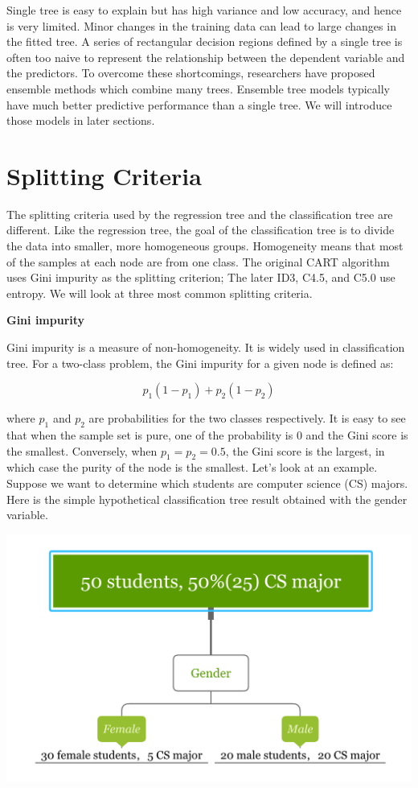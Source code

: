 \documentclass[12pt,]{krantz}
\begin{document}
Single tree is easy to explain but has high variance and low accuracy, and hence is very limited. Minor changes in the training data can lead to large changes in the fitted tree. A series of rectangular decision regions defined by a single tree is often too naive to represent the relationship between the dependent variable and the predictors. To overcome these shortcomings, researchers have proposed ensemble methods which combine many trees. Ensemble tree models typically have much better predictive performance than a single tree. We will introduce those models in later sections.

\hypertarget{splitting-criteria}{%
\section{Splitting Criteria}\label{splitting-criteria}}

The splitting criteria used by the regression tree and the classification tree are different. Like the regression tree, the goal of the classification tree is to divide the data into smaller, more homogeneous groups. Homogeneity means that most of the samples at each node are from one class. The original CART algorithm uses Gini impurity as the splitting criterion; The later ID3, C4.5, and C5.0 use entropy. We will look at three most common splitting criteria.

\textbf{Gini impurity}

Gini impurity\citep{Breiman1984} is a measure of non-homogeneity. It is widely used in classification tree. For a two-class problem, the Gini impurity for a given node is defined as:

\[p_{1}(1-p_{1})+p_{2}(1-p_{2})\]

where \(p_{1}\) and \(p_{2}\) are probabilities for the two classes respectively. It is easy to see that when the sample set is pure, one of the probability is 0 and the Gini score is the smallest. Conversely, when \(p_{1}=p_{2}=0.5\), the Gini score is the largest, in which case the purity of the node is the smallest. Let's look at an example. Suppose we want to determine which students are computer science (CS) majors. Here is the simple hypothetical classification tree result obtained with the gender variable.

\includegraphics{../linhui.org/book/Figure/giniEN.PNG}
\end{document}
